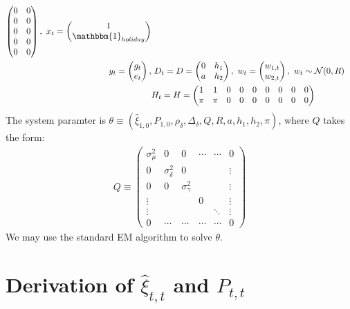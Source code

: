 \documentclass[12pt]{article}
\numberwithin{equation}{section}
\begin{document}
\begin{align*}
\begin{pmatrix}
        0 & 0 \\
        0 & 0 \\
        0 & 0 \\
        0 & 0 \\
        0 & 0 
    \end{pmatrix},
    \ 
    x_t = \begin{pmatrix}
        1 \\
        \mathbbm{1}_{holiday}
    \end{pmatrix} \\
    y_t = \begin{pmatrix}
        g_t \\
        e_t 
    \end{pmatrix},
    &\ 
    D_t = D = \begin{pmatrix}
        0 & h_1 \\
        a & h_2
    \end{pmatrix},
    \ 
    w_t = \begin{pmatrix}
        w_{1,t} \\
        w_{2,t}
    \end{pmatrix} 
    , \ w_t\sim\mathcal{N}(0,R) \\
    & H_t = H = \begin{pmatrix}
        1 & 1 & 0 & 0 & 0 & 0 & 0 & 0 & 0 \\
        \pi & \pi & 0 & 0 & 0 & 0 & 0 & 0 & 0
    \end{pmatrix}
\end{align*}
The system paramter is $\theta\equiv(\hat{\xi}_{1,0}, P_{1,0}, \rho_{\delta}, \Delta_{\delta}, Q, R, a, h_1, h_2, \pi)$, where $Q$ takes the form:
\begin{align*}
    Q \equiv \begin{pmatrix}
        \sigma_{\mu}^2 & 0 & 0 & \cdots & \cdots & 0 \\
        0 & \sigma_{\delta}^2 & 0 & & & \vdots \\
        0 & 0 & \sigma_{\gamma}^2 & & & \vdots \\
        \vdots & & & 0 & & \vdots \\
        \vdots & & & & \ddots & \vdots \\
        0 & \cdots & \cdots & \cdots & \cdots & 0
    \end{pmatrix}
\end{align*}
We may use the standard EM algorithm to solve $\theta$.

\printbibliography
\pagebreak
\appendix
\section{Derivation of $\hat{\xi}_{t,t}$ and $P_{t,t}$} \label{ap:iter_proj}
\end{document}
